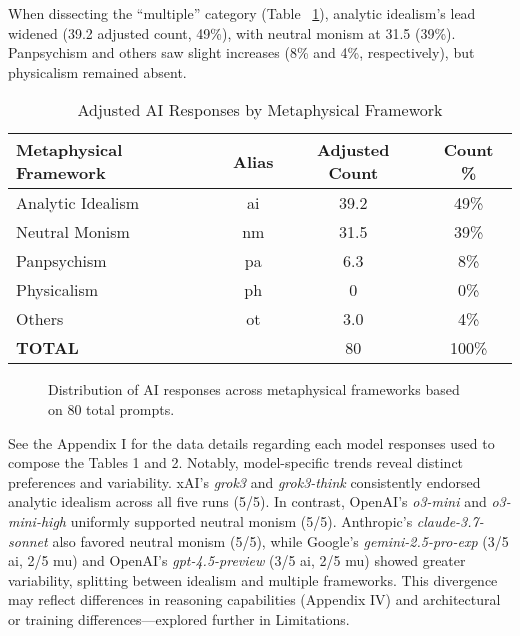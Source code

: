 \documentclass[11pt]{article}
\begin{document}
When dissecting the ``multiple'' category (Table ~\ref{tab:adjusted}), analytic idealism's lead widened (39.2 adjusted count, 49\%), with neutral monism at 31.5 (39\%). Panpsychism and others saw slight increases (8\% and 4\%, respectively), but physicalism remained absent.

\begin{table}[ht!]
\centering
\caption{Adjusted AI Responses by Metaphysical Framework}
\label{tab:adjusted}
\begin{tabular}{lccc}
\toprule
\textbf{Metaphysical Framework} & \textbf{Alias} & \textbf{Adjusted Count} & \textbf{Count \%} \\
\midrule
Analytic Idealism & ai & 39.2 & 49\% \\
Neutral Monism    & nm & 31.5 & 39\% \\
Panpsychism       & pa & 6.3  & 8\%  \\
Physicalism       & ph & 0    & 0\%  \\
Others            & ot & 3.0  & 4\%  \\
\midrule
\textbf{TOTAL}    &    & 80 & 100\% \\
\bottomrule
\end{tabular}
\end{table}

\begin{figure}[ht]
\centering
{}
\caption{Distribution of AI responses across metaphysical frameworks based on 80 total prompts.}
\label{fig:frameworks}
\end{figure}

See the Appendix I for the data details regarding each model responses used to compose the Tables 1 and 2. Notably, model-specific trends reveal distinct preferences and variability. xAI's \textit{grok3} and \textit{grok3-think} consistently endorsed analytic idealism across all five runs (5/5). In contrast, OpenAI's \textit{o3-mini} and \textit{o3-mini-high} uniformly supported neutral monism (5/5). Anthropic's \textit{claude-3.7-sonnet} also favored neutral monism (5/5), while Google's \textit{gemini-2.5-pro-exp} (3/5 ai, 2/5 mu) and OpenAI's \textit{gpt-4.5-preview} (3/5 ai, 2/5 mu) showed greater variability, splitting between idealism and multiple frameworks. This divergence may reflect differences in reasoning capabilities (Appendix IV) and architectural or training differences—explored further in Limitations.
\end{document}
